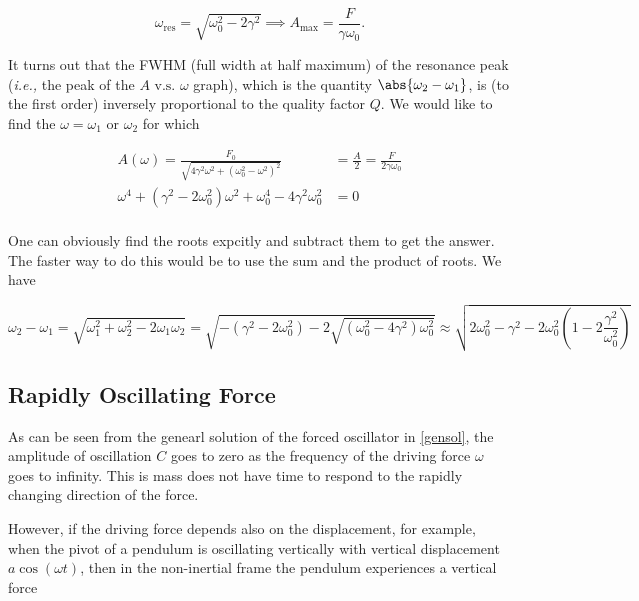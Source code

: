 \documentclass[english,a4paper,12pt]{report}
\begin{document}
\begin{equation}
    \omega _{\text{res} } = \sqrt{\omega _{0}^2 - 2\gamma ^2 } \implies A_{\text{max} } = \frac{F}{\gamma \omega _{0} }.  
\end{equation}

It turns out that the FWHM (full width at half maximum) of the resonance peak (\textit{i.e.,} the peak of the \(A \text{ v.s. } \omega  \) graph), which is the quantity \(\abs{\omega _{2} - \omega _{1} } \), is (to the first order) inversely proportional to the quality factor \(Q\). We would like to find the \(\omega = \omega _{1}\text { or } \omega _{2}  \) for which 

\begin{equation}
    \begin{aligned} 
    A(\omega ) = \frac{F_0 }{\sqrt{4\gamma ^2\omega  ^2+ (\omega _{0}^2 - \omega  ^2 )^2} } &= \frac{A}{2} = \frac{F}{2\gamma \omega _{0} } \\
    \omega ^{4} + (\gamma ^2 - 2\omega _{0}^2 ) \omega ^2+\omega _{0}^{4} - 4\gamma ^2\omega _{0}^2 &= 0\\    
    \end{aligned} 
\end{equation}

One can obviously find the roots expcitly and subtract them to get the answer. The faster way to do this would be to use the sum and the product of roots. We have

\begin{equation}
    \omega _{2} - \omega _{1} = \sqrt{\omega _{1}^2+\omega _{2}^2-2\omega _{1}\omega _{2}} = \sqrt{-(\gamma ^2-2\omega _{0}^2 ) -2 \sqrt{(\omega _{0}^2 - 4\gamma ^2 )\omega _{0}^2 } } \approx \sqrt{2\omega _{0}^2 -\gamma ^2 - 2\omega _{0}^2 \left( 1 -2\frac{\gamma ^2}{\omega _{0}^2 }  \right)  } 
\end{equation}

\subsection{Rapidly Oscillating Force}

As can be seen from the genearl solution of the forced oscillator in \cref{gensol}, the amplitude of oscillation \(C\) goes to zero as the frequency of the driving force \(\omega \) goes to infinity. This is mass does not have time to respond to the rapidly changing direction of the force. 

However, if the driving force depends also on the displacement, for example, when the pivot of a pendulum is oscillating vertically with vertical displacement \(a \cos (\omega t)\), then in the non-inertial frame the pendulum experiences a vertical force   
\end{document}

